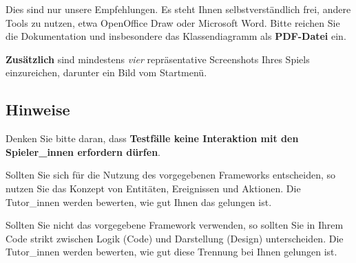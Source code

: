 Dies sind nur unsere Empfehlungen. Es steht Ihnen selbstverst\"andlich frei,
andere Tools zu nutzen, etwa OpenOffice Draw oder Microsoft Word. Bitte reichen Sie
die Dokumentation und insbesondere das Klassendiagramm als \textbf{PDF-Datei} ein.

\textbf{Zus\"atzlich} sind mindestens \emph{vier} repr\"asentative Screenshots Ihres Spiels einzureichen, darunter ein Bild vom Startmen\"u.

\subsection{Hinweise}
\label{sec:hinweise}

Denken Sie bitte daran, dass \textbf{Testf\"alle keine Interaktion mit den Spieler\_innen erfordern d\"urfen}.

Sollten Sie sich für die Nutzung des vorgegebenen Frameworks entscheiden, so nutzen Sie das Konzept von Entitäten, Ereignissen und Aktionen. Die Tutor\_innen werden bewerten, wie gut Ihnen das gelungen ist.

Sollten Sie nicht das vorgegebene Framework verwenden, so sollten Sie in Ihrem Code strikt zwischen Logik (Code) und Darstellung (Design) unterscheiden. Die Tutor\_innen werden bewerten, wie gut diese Trennung bei Ihnen gelungen ist.
